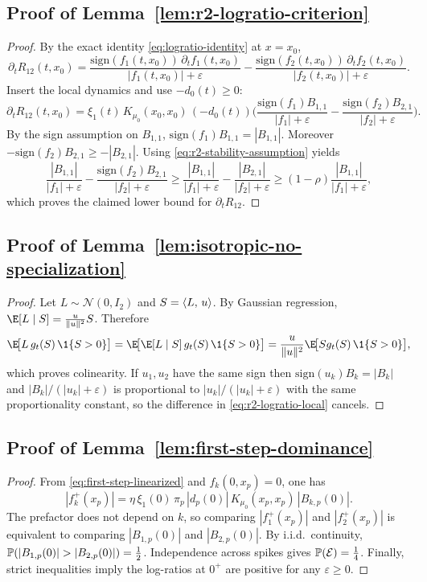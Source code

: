 \subsection*{Proof of Lemma~\ref{lem:r2-logratio-criterion}}
\begin{proof}
By the exact identity \eqref{eq:logratio-identity} at $x=x_0$,
\[
\partial_t R_{12}(t,x_0)=\frac{\mathrm{sign}(f_1(t,x_0))\,\partial_t f_1(t,x_0)}{|f_1(t,x_0)|+\varepsilon}
-\frac{\mathrm{sign}(f_2(t,x_0))\,\partial_t f_2(t,x_0)}{|f_2(t,x_0)|+\varepsilon}.
\]
Insert the local dynamics and use $-d_0(t)\ge 0$:
\[
\partial_t R_{12}(t,x_0)=\xi_1(t)\,K_{\mu_0}(x_0,x_0)\,(-d_0(t))\Big(
\frac{\mathrm{sign}(f_1)B_{1,1}}{|f_1|+\varepsilon}-\frac{\mathrm{sign}(f_2)B_{2,1}}{|f_2|+\varepsilon}\Big).
\]
By the sign assumption on $B_{1,1}$, $\mathrm{sign}(f_1)B_{1,1}=|B_{1,1}|$.
Moreover $-\mathrm{sign}(f_2)B_{2,1}\ge -|B_{2,1}|$.
Using \eqref{eq:r2-stability-assumption} yields
\[
\frac{|B_{1,1}|}{|f_1|+\varepsilon}-\frac{\mathrm{sign}(f_2)B_{2,1}}{|f_2|+\varepsilon}
\ge \frac{|B_{1,1}|}{|f_1|+\varepsilon}-\frac{|B_{2,1}|}{|f_2|+\varepsilon}
\ge (1-\rho)\frac{|B_{1,1}|}{|f_1|+\varepsilon},
\]
which proves the claimed lower bound for $\partial_t R_{12}$.
\end{proof}

\subsection*{Proof of Lemma~\ref{lem:isotropic-no-specialization}}
\begin{proof}
Let $L\sim\mathcal{N}(0,I_2)$ and $S=\left\langle L,\,u \right\rangle$.
By Gaussian regression, $\E[L\mid S]=\frac{u}{\|u\|^2}S$.
Therefore
\[
\E\!\big[L\,g_t(S)\,\1\{S>0\}\big]=\E\!\big[\E[L\mid S]\,g_t(S)\,\1\{S>0\}\big]
=\frac{u}{\|u\|^2}\E\!\big[Sg_t(S)\,\1\{S>0\}\big],
\]
which proves colinearity.
If $u_1,u_2$ have the same sign then $\mathrm{sign}(u_k)B_k=|B_k|$ and $|B_k|/(|u_k|+\varepsilon)$ is proportional to $|u_k|/(|u_k|+\varepsilon)$ with the same proportionality constant, so the difference in \eqref{eq:r2-logratio-local} cancels.
\end{proof}

\subsection*{Proof of Lemma~\ref{lem:first-step-dominance}}
\begin{proof}
From \eqref{eq:first-step-linearized} and $f_k(0,x_p)=0$, one has
\[
|f_k^{+}(x_p)|=\eta\,\xi_1(0)\,\pi_p\,|d_p(0)|\,K_{\mu_0}(x_p,x_p)\,|B_{k,p}(0)|.
\]
The prefactor does not depend on $k$, so comparing $|f_1^{+}(x_p)|$ and $|f_2^{+}(x_p)|$ is equivalent to comparing $|B_{1,p}(0)|$ and $|B_{2,p}(0)|$.
By i.i.d.\ continuity, $\Pp(|B_{1,p}(0)|>|B_{2,p}(0)|)=\tfrac12$.
Independence across spikes gives $\mathbb{P}(\mathcal{E})=\tfrac14$.
Finally, strict inequalities imply the log-ratios at $0^{+}$ are positive for any $\varepsilon\ge 0$.
\end{proof}

